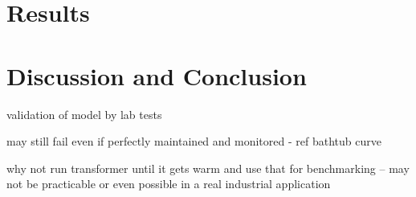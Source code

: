 \documentclass[]{article}
\begin{document}







\section{Results} \label{sec:results}


\section{Discussion and Conclusion} \label{sec:conclusion}


validation of model by lab tests

may still fail even if perfectly maintained and monitored - ref bathtub curve

why not run transformer until it gets warm and use that for benchmarking -- may not be practicable or even possible in a real industrial application

\clearpage
\vspace{5mm}



\end{document}
